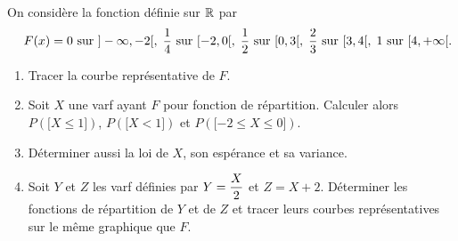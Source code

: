 \documentclass[a4paper, 11pt,reqno]{article}
\begin{document}
\begin{exercice}  \;
	On consid\`ere la fonction d\'efinie sur $\mathbb{R}$ par
	$$\quad F(x)=  0 \hbox{ sur } ]-\infty,-2[, \; \frac{1}{4} \hbox{ sur } [-2,0[, \; \frac{1}{2} \hbox{ sur } [0,3[, \; \frac{2}{3} \hbox{ sur } [3,4[ , \; 1 \hbox{ sur } [4,+\infty[.$$
	\begin{enumerate}
		\item Tracer la courbe repr\'esentative de $F$.
		\item Soit $X$ une varf ayant $F$ pour fonction de r\'epartition. Calculer alors $P(\lbrack X\leq 1\rbrack)$, $P(\lbrack X< 1\rbrack)$ et $P(\lbrack -2\leq X\leq 0\rbrack)$.
		\item D\'eterminer aussi la loi de $X$, son esp\'erance et sa variance.
		\item Soit $Y$ et $Z$ les varf d\'efinies par $Y=\displaystyle\frac{X}{2}$ et $Z=X+2$. D\'eterminer les fonctions de r\'epartition de $Y$ et de $Z$ et tracer leurs courbes repr\'esentatives sur le m\^eme graphique que $F$.
	\end{enumerate}
\end{exercice}
\end{document}
